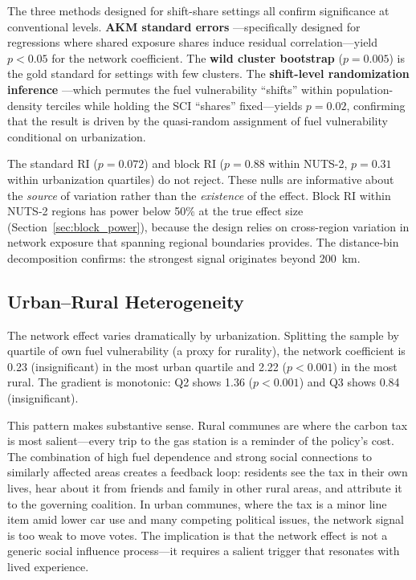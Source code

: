 \documentclass[12pt]{article}
\begin{document}
The three methods designed for shift-share settings all confirm significance at conventional levels. \textbf{AKM standard errors} \citep{adao2019shift}---specifically designed for regressions where shared exposure shares induce residual correlation---yield $p < 0.05$ for the network coefficient. The \textbf{wild cluster bootstrap} ($p = 0.005$) is the gold standard for settings with few clusters. The \textbf{shift-level randomization inference} \citep{borusyak2022quasi}---which permutes the fuel vulnerability ``shifts'' within population-density terciles while holding the SCI ``shares'' fixed---yields $p = 0.02$, confirming that the result is driven by the quasi-random assignment of fuel vulnerability conditional on urbanization.

The standard RI ($p = 0.072$) and block RI ($p = 0.88$ within NUTS-2, $p = 0.31$ within urbanization quartiles) do not reject. These nulls are informative about the \emph{source} of variation rather than the \emph{existence} of the effect. Block RI within NUTS-2 regions has power below 50\% at the true effect size (Section~\ref{sec:block_power}), because the design relies on cross-region variation in network exposure that spanning regional boundaries provides. The distance-bin decomposition confirms: the strongest signal originates beyond 200~km.

\subsection{Urban--Rural Heterogeneity}

The network effect varies dramatically by urbanization. Splitting the sample by quartile of own fuel vulnerability (a proxy for rurality), the network coefficient is 0.23 (insignificant) in the most urban quartile and 2.22 ($p < 0.001$) in the most rural. The gradient is monotonic: Q2 shows 1.36 ($p < 0.001$) and Q3 shows 0.84 (insignificant).

This pattern makes substantive sense. Rural communes are where the carbon tax is most salient---every trip to the gas station is a reminder of the policy's cost. The combination of high fuel dependence and strong social connections to similarly affected areas creates a feedback loop: residents see the tax in their own lives, hear about it from friends and family in other rural areas, and attribute it to the governing coalition. In urban communes, where the tax is a minor line item amid lower car use and many competing political issues, the network signal is too weak to move votes. The implication is that the network effect is not a generic social influence process---it requires a salient trigger that resonates with lived experience.
\end{document}
